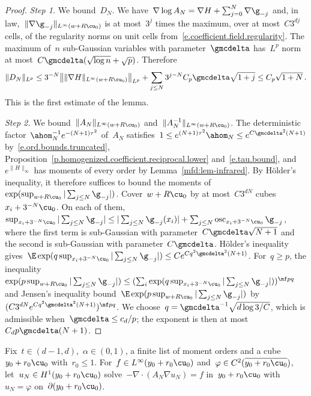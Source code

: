 \documentclass[11pt]{amsart}
\begin{document}
\begin{proof}
\emph{Step 1.} We bound~$D_N$. We have~$\nabla\log A_N=\nabla H+\sum_{j=0}^N\nabla\g_{-j}$ and, in law,~$\|\nabla\g_{-j}\|_{L^\infty(w+R\cu_0)}$ is at most~$3^j$ times the maximum, over at most~$C3^{dj}$ cells, of the regularity norms on unit cells from~\eqref{e.coefficient.field.regularity}. The maximum of~$n$ sub-Gaussian variables with parameter~$\gmcdelta$ has~$L^p$ norm at most~$C\gmcdelta(\sqrt{\log n}+\sqrt p)$. Therefore
\begin{equation*}
	\|D_N\|_{L^p}\leq3^{-N}\bigl\|\|\nabla H\|_{L^\infty(w+R\cu_0)}\bigr\|_{L^p}+\sum_{j\leq N}3^{j-N}C_p\gmcdelta\sqrt{1+j}\leq C_p\sqrt{1+N}\,.
\end{equation*}
This is the first estimate of the lemma.

\smallskip

\emph{Step 2.} We bound~$\|A_N\|_{L^\infty(w+R\cu_0)}$ and~$\|A_N^{-1}\|_{L^\infty(w+R\cu_0)}$. The deterministic factor~$\ahom_N^{-1}e^{-(N+1)\tau^2}$ of~$A_N$ satisfies~$1\leq e^{(N+1)\tau^2}\ahom_N\leq e^{C\gmcdelta^2(N+1)}$ by~\eqref{e.ord.bounds.truncated}, Proposition~\ref{p.homogenized.coefficient.reciprocal.lower} and~\eqref{e.tau.bound}, and~$e^{\|H\|_\infty}$ has moments of every order by Lemma~\ref{mfd:lem-infrared}. By H\"older's inequality, it therefore suffices to bound the moments of~$\exp(\sup_{w+R\cu_0}|\sum_{j\leq N}\g_{-j}|)$. Cover~$w+R\cu_0$ by at most~$C3^{dN}$ cubes~$x_i+3^{-N}\cu_0$. On each of them,~$\sup_{x_i+3^{-N}\cu_0}|\sum_{j\leq N}\g_{-j}|\leq|\sum_{j\leq N}\g_{-j}(x_i)|+\sum_{j\leq N}\operatorname{osc}_{x_i+3^{-N}\cu_0}\g_{-j}$, where the first term is sub-Gaussian with parameter~$C\gmcdelta\sqrt{N+1}$ and the second is sub-Gaussian with parameter~$C\gmcdelta$. H\"older's inequality gives~$\E\exp(q\sup_{x_i+3^{-N}\cu_0}|\sum_{j\leq N}\g_{-j}|)\leq Ce^{Cq^2\gmcdelta^2(N+1)}$. For~$q\geq p$, the inequality~$\exp(p\sup_{w+R\cu_0}|\sum_{j\leq N}\g_{-j}|)\leq(\sum_i\exp(q\sup_{x_i+3^{-N}\cu_0}|\sum_{j\leq N}\g_{-j}|))^{\nf pq}$ and Jensen's inequality bound~$\E\exp(p\sup_{w+R\cu_0}|\sum_{j\leq N}\g_{-j}|)$ by~$(C3^{dN}e^{Cq^2\gmcdelta^2(N+1)})^{\nf pq}$. We choose~$q=\gmcdelta^{-1}\sqrt{d\log3/C}$, which is admissible when~$\gmcdelta\leq c_d/p$; the exponent is then at most~$C_dp\gmcdelta(N+1)$.
\end{proof}

Fix~$t\in(d-1,d)$,~$\alpha\in(0,1)$, a finite list of moment orders and a cube~$y_0+r_0\cu_0$ with~$r_0\leq1$. For~$f\in L^\infty(y_0+r_0\cu_0)$ and~$\varphi\in C^2(\overline{y_0+r_0\cu_0})$, let~$u_N\in H^1(y_0+r_0\cu_0)$ solve~$-\nabla\cdot(A_N\nabla u_N)=f$ in~$y_0+r_0\cu_0$ with~$u_N=\varphi$ on~$\partial(y_0+r_0\cu_0)$.
\end{document}
